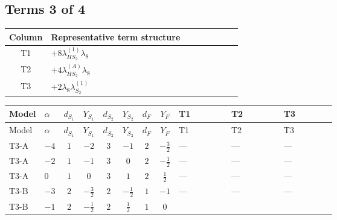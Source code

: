 \documentclass[8pt]{article}
\begin{document}
\begin{landscape}
\subsection*{Terms 3 of 4}
\begin{center}
\begin{tabular}{@{}c >{\raggedright\arraybackslash}p{0.82\linewidth}@{}}
\toprule
Column & Representative term structure \\
\midrule
T1 & \(\displaystyle +8 {\lambda_{HS_2}^{(1)}} {\lambda_{8}}\) \\
\midrule
T2 & \(\displaystyle +4 {\lambda_{HS_2}^{(A)}} {\lambda_{8}}\) \\
\midrule
T3 & \(\displaystyle +2 {\lambda_{8}} {\lambda_{S_2}^{(1)}}\) \\
\midrule
\bottomrule
\end{tabular}
\end{center}
\smallskip
\tiny
\begin{longtable}{@{}llcccccc >{\raggedright\arraybackslash}p{0.21\linewidth} >{\raggedright\arraybackslash}p{0.21\linewidth} >{\raggedright\arraybackslash}p{0.21\linewidth}@{}}
\toprule
Model & $\alpha$ & $d_{S_1}$ & $Y_{S_1}$ & $d_{S_2}$ & $Y_{S_2}$ & $d_F$ & $Y_F$ & T1 & T2 & T3 \\
\midrule
\endfirsthead
\toprule
Model & $\alpha$ & $d_{S_1}$ & $Y_{S_1}$ & $d_{S_2}$ & $Y_{S_2}$ & $d_F$ & $Y_F$ & T1 & T2 & T3 \\
\midrule
\endhead
T3-A & $-4$ & $1$ & $-2$ & $3$ & $-1$ & $2$ & $-\frac{3}{2}$ & --- & --- & --- \\
\midrule
T3-A & $-2$ & $1$ & $-1$ & $3$ & $0$ & $2$ & $-\frac{1}{2}$ & --- & --- & --- \\
\midrule
T3-A & $0$ & $1$ & $0$ & $3$ & $1$ & $2$ & $\frac{1}{2}$ & --- & --- & --- \\
\midrule
T3-B & $-3$ & $2$ & $-\frac{3}{2}$ & $2$ & $-\frac{1}{2}$ & $1$ & $-1$ & --- & --- & --- \\
\midrule
T3-B & $-1$ & $2$ & $-\frac{1}{2}$ & $2$ & $\frac{1}{2}$ & $1$ & $0$ & \scriptsize\adjustbox{max width=\linewidth}{$\begin{gathered} +8 {\lambda_{HS_2}^{(1)}} {\lambda_{8}}\end{gathered}$} & \scriptsize\adjustbox{max width=\linewidth}{$\begin{gathered} +4 {\lambda_{HS_2}^{(A)}} {\lambda_{8}}\end{gathered}$} & \scriptsize\adjustbox{max width=\linewidth}{$\begin{gathered} +2 {\lambda_{8}} {\lambda_{S_2}^{(1)}}\end{gathered}$} \\

\end{longtable}
\end{landscape}
\end{document}
